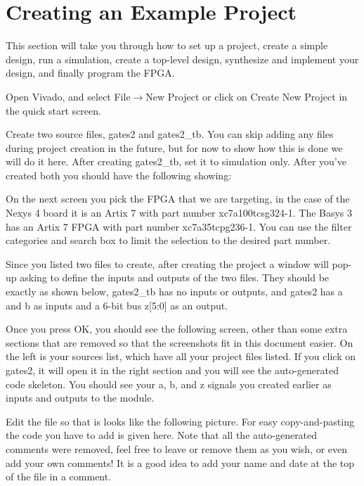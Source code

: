 \section{Creating an Example Project}
\label{sec:example_project}

This section will take you through how to set up a project, create a simple design, run a
simulation, create a top-level design, synthesize and implement your design, and finally
program the FPGA.

Open Vivado, and select File$\rightarrow$New Project or click on Create New Project in the
quick start screen.


Create two source files, gates2 and gates2\_tb.
You can skip adding any files during project creation in the future, but for now to show how
this is done we will do it here.
After creating gates2\_tb, set it to simulation only.
After you've created both you should have the following showing:


On the next screen you pick the FPGA that we are targeting, in the case of the Nexys 4 board it is
an Artix 7 with part number xc7a100tcsg324-1.
The Basys 3 has an Artix 7 FPGA with part number xc7a35tcpg236-1.
You can use the filter categories and search box to limit the selection to the desired part number.


Since you listed two files to create, after creating the project a window will pop-up asking to
define the inputs and outputs of the two files.
They should be exactly as shown below, gates2\_tb has no inputs or outputs, and gates2 has a and b
as inputs and a 6-bit bus z[5:0] as an output.


Once you press OK, you should see the following screen, other than some extra sections that are
removed so that the screenshots fit in this document easier.
On the left is your sources list, which have all your project files listed.
If you click on gates2, it will open it in the right section and you will see the auto-generated
code skeleton.
You should see your a, b, and z signals you created earlier as inputs and outputs to the module.


Edit the file so that is looks like the following picture.
For easy copy-and-pasting the code you have to add is given here.
Note that all the auto-generated comments were removed, feel free to leave or remove them as
you wish, or even add your own comments! It is a good idea to add your name and date at the top
of the file in a comment.

